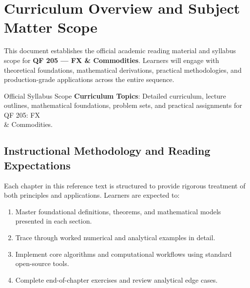 \section{Curriculum Overview and Subject Matter Scope}

This document establishes the official academic reading material and syllabus scope for \textbf{QF 205 --- FX \& Commodities}. Learners will engage with theoretical foundations, mathematical derivations, practical methodologies, and production-grade applications across the entire sequence.

\begin{InsightBox}{Official Syllabus Scope}
  \textbf{Curriculum Topics}: Detailed curriculum, lecture outlines, mathematical foundations, problem sets, and practical assignments for QF 205: FX \\& Commodities.
\end{InsightBox}

\subsection{Instructional Methodology and Reading Expectations}

Each chapter in this reference text is structured to provide rigorous treatment of both principles and applications. Learners are expected to:
\begin{enumerate}
  \item Master foundational definitions, theorems, and mathematical models presented in each section.
  \item Trace through worked numerical and analytical examples in detail.
  \item Implement core algorithms and computational workflows using standard open-source tools.
  \item Complete end-of-chapter exercises and review analytical edge cases.
\end{enumerate}

